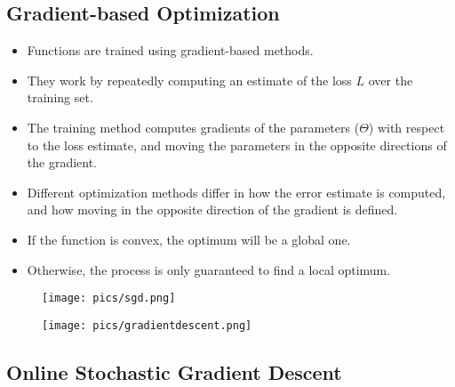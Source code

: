 \subsection{Gradient-based Optimization}
\begin{itemize}
\item Functions are trained using  gradient-based methods.

\item They work by repeatedly computing an estimate of the loss $L$ over the training set.

\item The training method computes gradients of the parameters ($\Theta$)  with respect to the loss estimate, and moving the parameters in the opposite directions of the gradient. 

\item Different optimization methods differ in how the error estimate is computed, and how moving in the opposite direction of the gradient is defined.

\item If the function is convex, the optimum will be a global one.

\item Otherwise, the process is only guaranteed to find a local optimum.


\end{itemize}

\begin{figure}[htb]
	\centering
	 \texttt{[image: pics/sgd.png]}
\end{figure}


\begin{figure}[htb]
	\centering
	 \texttt{[image: pics/gradientdescent.png]}
\end{figure}





\subsection{Online Stochastic Gradient Descent}

